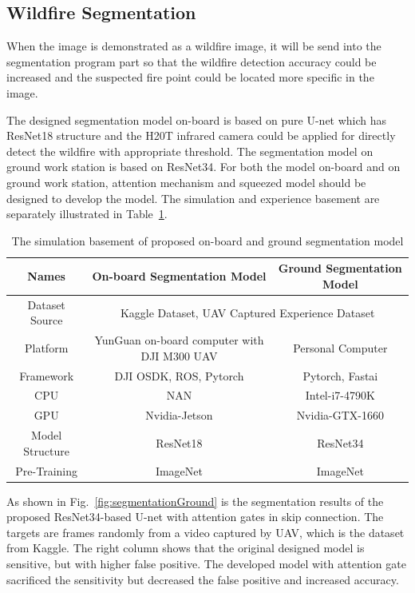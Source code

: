 \subsection{Wildfire Segmentation}
When the image is demonstrated as a wildfire image, it will be send into the segmentation program part so that the wildfire detection accuracy could be increased and the suspected fire point could be located more specific in the image.\par
The designed segmentation model on-board is based on pure U-net which has ResNet18 structure and the H20T infrared camera could be applied for directly detect the wildfire with appropriate threshold. The segmentation model on ground work station is based on ResNet34. For both the model on-board and on ground work station, attention mechanism and squeezed model should be designed to develop the model. The simulation and experience basement are separately illustrated in Table~\ref{table:segprogram}.
\begin{table}[ht]
\centering
\caption{The simulation basement of proposed on-board and ground segmentation model}
\label{table:segprogram}
    \small
    \begin{tabular}{c c c}
    \toprule
        Names & On-board Segmentation Model & Ground Segmentation Model\\
        \hline
        Dataset Source& \multicolumn{2}{c}{Kaggle Dataset, UAV Captured Experience Dataset}\\
        \rowcolor{mygray}
        Platform & YunGuan on-board computer with DJI M300 UAV& Personal Computer\\
        Framework &  DJI OSDK, ROS, Pytorch & Pytorch, Fastai\\
        \rowcolor{mygray}
        CPU & NAN& {Intel-i7-4790K}\\
        \rowcolor{mygray}
        GPU & Nvidia-Jetson & Nvidia-GTX-1660\\
        \rowcolor{mygray}
        Model Structure& ResNet18& ResNet34\\
        Pre-Training & ImageNet & ImageNet\\
    \bottomrule
    \end{tabular}
\end{table}
\par
As shown in Fig.~\ref{fig:segmentationGround} is the segmentation results of the proposed ResNet34-based U-net with attention gates in skip connection. The targets are frames randomly from a video captured by UAV, which is the dataset from Kaggle. The right column shows that the original designed model is sensitive, but with higher false positive. The developed model with attention gate sacrificed the sensitivity but decreased the false positive and increased accuracy.

